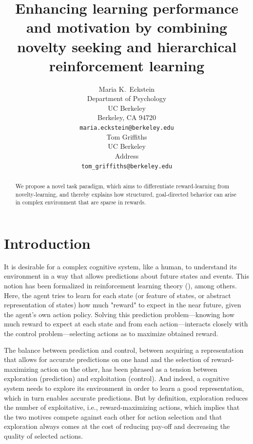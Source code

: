 \documentclass{article}
\title{Enhancing learning performance and motivation by combining novelty seeking and hierarchical reinforcement learning}
\author{
  Maria K.~Eckstein \\
  Department of Psychology \\
  UC Berkeley \\
  Berkeley, CA 94720 \\
  \texttt{maria.eckstein@berkeley.edu} \\  
  \And
  Tom Griffiths \\
  UC Berkeley \\
  Address \\
  \texttt{tom_griffiths@berkeley.edu} \\
}
\begin{document}
\maketitle

\begin{abstract}
  We propose a novel task paradigm, which aims to differentiate reward-learning from novelty-learning, and thereby explains how structured, goal-directed behavior can arise in complex environment that are sparse in rewards. 
\end{abstract}

\section{Introduction}

It is desirable for a complex cognitive system, like a human, to understand its environment in a way that allows predictions about future states and events. This notion has been formalized in reinforcement learning theory (\cite{sutton_reinforcement_2017}), among others. Here, the agent tries to learn for each state (or feature of states, or abstract representation of states) how much "reward" to expect in the near future, given the agent's own action policy. Solving this prediction problem---knowing how much reward to expect at each state and from each action---interacts closely with the control problem---selecting actions as to maximize obtained reward. 

The balance between prediction and control, between acquiring a representation that allows for accurate predictions on one hand and the selection of reward-maximizing action on the other, has been phrased as a tension between exploration (prediction) and exploitation (control). And indeed, a cognitive system needs to explore its environment in order to learn a good representation, which in turn enables accurate predictions. But by definition, exploration reduces the number of exploitative, i.e., reward-maximizing actions, which implies that the two motives compete against each other for action selection and that exploration always comes at the cost of reducing pay-off and decreasing the quality of selected actions.
\end{document}
